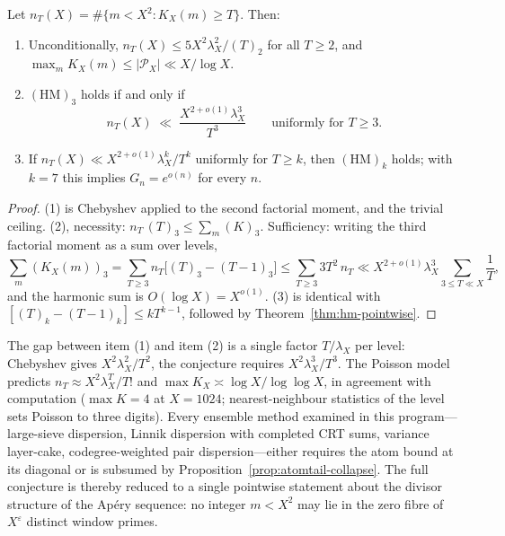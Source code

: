 \begin{theorem}
\label{thm:atomtail-conc}
Let $n_T(X)=\#\{m<X^2:K_X(m)\ge T\}$.  Then:
\begin{enumerate}
\item Unconditionally,
$n_T(X)\le5X^2\lambda_X^2/(T)_2$ for all $T\ge2$, and
$\max_mK_X(m)\le|\mathcal P_X|\ll X/\log X$.
\item $(\mathrm{HM})_3$ holds if and only if
\[
 n_T(X)\;\ll\;\frac{X^{2+o(1)}\lambda_X^3}{T^3}
 \qquad\text{uniformly for }T\ge3 .
\]
\item If $n_T(X)\ll X^{2+o(1)}\lambda_X^k/T^k$ uniformly for
$T\ge k$, then $(\mathrm{HM})_k$ holds; with $k=7$ this implies
$G_n=e^{o(n)}$ for every $n$.
\end{enumerate}
\end{theorem}

\begin{proof}
(1) is Chebyshev applied to the second factorial moment, and the
trivial ceiling.  (2), necessity: $n_T\,(T)_3\le\sum_m(K)_3$.
Sufficiency: writing the third factorial moment as a sum over
levels,
\[
 \sum_m(K_X(m))_3
 =\sum_{T\ge3}n_T\bigl[(T)_3-(T-1)_3\bigr]
 \le\sum_{T\ge3}3T^2\,n_T
 \ll X^{2+o(1)}\lambda_X^3\sum_{3\le T\ll X}\frac1T,
\]
and the harmonic sum is $O(\log X)=X^{o(1)}$.  (3) is identical
with $[(T)_k-(T-1)_k]\le kT^{k-1}$, followed by
Theorem~\ref{thm:hm-pointwise}.
\end{proof}

\begin{remark}
\label{rem:atomtail-frontier}
The gap between item (1) and item (2) is a single factor
$T/\lambda_X$ per level: Chebyshev gives
$X^2\lambda_X^2/T^2$, the conjecture requires
$X^2\lambda_X^3/T^3$.  The Poisson model predicts
$n_T\approx X^2\lambda_X^T/T!$ and
$\max K_X\asymp\log X/\log\log X$, in agreement with
computation ($\max K=4$ at $X=1024$; nearest-neighbour
statistics of the level sets Poisson to three digits).  Every
ensemble method examined in this program---large-sieve
dispersion, Linnik dispersion with completed CRT sums, variance
layer-cake, codegree-weighted pair dispersion---either requires
the atom bound at its diagonal or is subsumed by
Proposition~\ref{prop:atomtail-collapse}.  The full conjecture
is thereby reduced to a single pointwise statement about the
divisor structure of the Ap\'ery sequence: no integer
$m<X^2$ may lie in the zero fibre of
$X^{\varepsilon}$ distinct window primes.
\end{remark}

